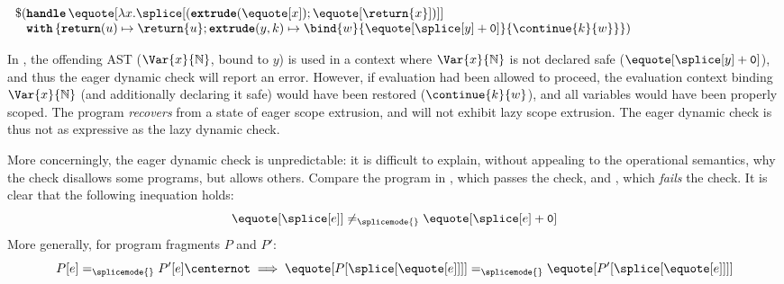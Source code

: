 \begin{code} 
 \begin{source}
  $\begin{array}{l}
      \$ (\textbf{\texttt{handle}} \, \equote[{\lambda x. {\splice[({{\textbf{\texttt{extrude}}(\equote[x])}; \equote[\return{x}]})]}}] \\
      \;\;\,\,\textbf{\texttt{with}} \, \{ \textbf{\texttt{return}}(u) \mapsto {\return{u}}; \textbf{\texttt{extrude}}(y, k) \mapsto {\bind{w}{\equote[{\splice[y]} + \texttt{0}]}{\continue{k}{w}}}\})
    \end{array}$
 \end{source}
 \label{listing:eager-scope-extrusion-looks-unsafe}
\end{code}

In , the offending AST ($\Var{x}{\mathbb{N}}$, bound to $y$) is used in a context where $\Var{x}{\mathbb{N}}$ is not declared safe ($\equote[{\splice[y]} + \texttt{0}]$), and thus the eager dynamic check will report an error. However, if evaluation had been allowed to proceed, the evaluation context binding $\Var{x}{\mathbb{N}}$ (and additionally declaring it safe) would have been restored ($\continue{k}{w}$), and all variables would have been properly scoped. The program \textit{recovers} from a state of eager scope extrusion, and will not exhibit lazy scope extrusion. The eager dynamic check is thus not as expressive as the lazy dynamic check.

More concerningly, the eager dynamic check is unpredictable: it is difficult to explain, without appealing to the operational semantics, why the check disallows some programs, but allows others. Compare the program in , which passes the check, and , which \textit{fails} the check. It is clear that the following inequation holds:
\[\equote[\splice[e]] \neq_{\splicemode{}} \equote[{\splice[e] + \texttt{0}}]\]
More generally, for program fragments $P$ and $P'$:
\[P[e] =_{\splicemode{}} P'[e] \centernot\implies \equote[{P[\splice[{\equote[e]}]]}] =_{\splicemode{}} \equote[{P'[\splice[{\equote[e]}]]}]\]

